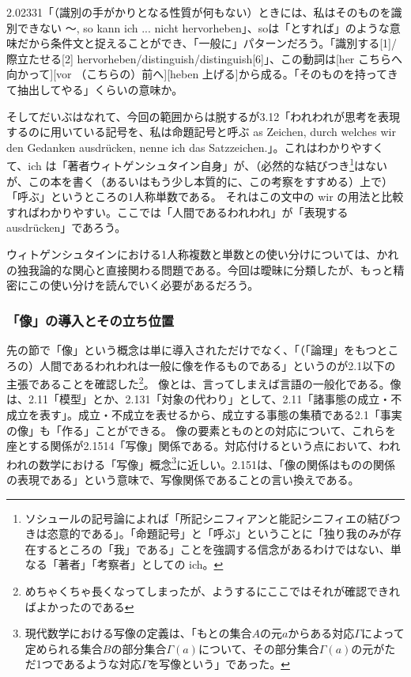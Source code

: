 \documentclass[11pt,a4paper]{jsarticle}
\begin{document}
{2.02331「（識別の手がかりとなる性質が何もない）ときには、私はそのものを識別できない 〜, so kann ich ... nicht hervorheben」、soは「とすれば」のような意味だから条件文と捉えることができ、「一般に」パターンだろう。「識別する[1]/際立たせる[2] hervorheben/distinguish/distinguish[6]」、この動詞は[her こちらへ向かって][vor （こちらの）前へ][heben 上げる]から成る。「そのものを持ってきて抽出してやる」くらいの意味か。

そしてだいぶはなれて、今回の範囲からは脱するが3.12「われわれが思考を表現するのに用いている記号を、私は命題記号と呼ぶ as Zeichen, durch welches wir den Gedanken ausdr\"ucken, nenne ich das Satzzeichen.」。これはわかりやすくて、ich は「著者ウィトゲンシュタイン自身」が、（必然的な結びつき\footnote{ソシュールの記号論によれば「所記シニフィアンと能記シニフィエの結びつきは恣意的である」。「命題記号」と「呼ぶ」ということに「独り我のみが存在するところの「我」である」ことを強調する信念があるわけではない、単なる「著者」「考察者」としての ich。}はないが、この本を書く（あるいはもう少し本質的に、この考察をすすめる）上で）「呼ぶ」というところの1人称単数である。
それはこの文中の wir の用法と比較すればわかりやすい。ここでは「人間であるわれわれ」が「表現する ausdr\"ucken」であろう。

ウィトゲンシュタインにおける1人称複数と単数との使い分けについては、かれの独我論的な関心と直接関わる問題である。今回は曖昧に分類したが、もっと精密にこの使い分けを読んでいく必要があるだろう。
}

\subsubsection{「像」の導入とその立ち位置}
先の節で「像」という概念は単に導入されただけでなく、「（「論理」をもつところの）人間であるわれわれは一般に像を作るものである」というのが2.1以下の主張であることを確認した\footnote{めちゃくちゃ長くなってしまったが、ようするにここではそれが確認できればよかったのである}。
像とは、言ってしまえば言語の一般化である。像は、2.11「模型」とか、2.131「対象の代わり」として、2.11「諸事態の成立・不成立を表す」。成立・不成立を表せるから、成立する事態の集積である2.1「事実の像」も「作る」ことができる。
像の要素とものとの対応について、これらを座とする関係が2.1514「写像」関係である。対応付けるという点において、われわれの数学における「写像」概念\footnote{現代数学における写像の定義は、「もとの集合$A$の元$a$からある対応$\Gamma$によって定められる集合$B$の部分集合$\Gamma (a)$について、その部分集合$\Gamma (a)$の元がただ1つであるような対応$\Gamma$を写像という」であった。}に近しい。2.151は、「像の関係はものの関係の表現である」という意味で、写像関係であることの言い換えである。
\end{document}
